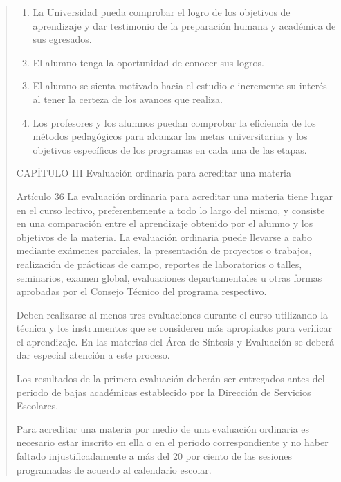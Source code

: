 \documentclass[
  12,
]{scrartcl}
\providecommand{\tightlist}{%
  \setlength{\itemsep}{0pt}\setlength{\parskip}{0pt}}
\begin{document}
\begin{enumerate}
\begin{quote}
  \begin{enumerate}
  \def\labelenumii{\alph{enumii})}
  \tightlist
  \item
    La Universidad pueda comprobar el logro de los objetivos de
    aprendizaje y dar testimonio de la preparación humana y académica de
    sus egresados.
  \item
    El alumno tenga la oportunidad de conocer sus logros.
  \item
    El alumno se sienta motivado hacia el estudio e incremente su
    interés al tener la certeza de los avances que realiza.
  \item
    Los profesores y los alumnos puedan comprobar la eficiencia de los
    métodos pedagógicos para alcanzar las metas universitarias y los
    objetivos específicos de los programas en cada una de las etapas.
  \end{enumerate}

  CAPÍTULO III Evaluación ordinaria para acreditar una materia

  Artículo 36 La evaluación ordinaria para acreditar una materia tiene
  lugar en el curso lectivo, preferentemente a todo lo largo del mismo,
  y consiste en una comparación entre el aprendizaje obtenido por el
  alumno y los objetivos de la materia. La evaluación ordinaria puede
  llevarse a cabo mediante exámenes parciales, la presentación de
  proyectos o trabajos, realización de prácticas de campo, reportes de
  laboratorios o talles, seminarios, examen global, evaluaciones
  departamentales u otras formas aprobadas por el Consejo Técnico del
  programa respectivo.

  Deben realizarse al menos tres evaluaciones durante el curso
  utilizando la técnica y los instrumentos que se consideren más
  apropiados para verificar el aprendizaje. En las materias del Área de
  Síntesis y Evaluación se deberá dar especial atención a este proceso.

  Los resultados de la primera evaluación deberán ser entregados antes
  del periodo de bajas académicas establecido por la Dirección de
  Servicios Escolares.

  Para acreditar una materia por medio de una evaluación ordinaria es
  necesario estar inscrito en ella o en el periodo correspondiente y no
  haber faltado injustificadamente a más del 20 por ciento de las
  sesiones programadas de acuerdo al calendario escolar.
  \end{quote}
\end{enumerate}
\end{document}
